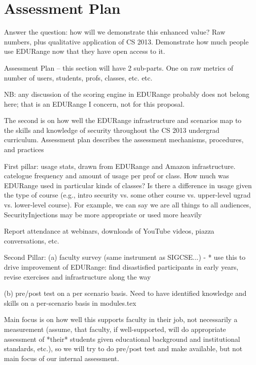 \section*{Assessment Plan}

Answer the question: how will we demonstrate this enhanced value? Raw numbers,
plus qualitative application of CS 2013. Demonstrate how much people use EDURange
now that they have open access to it.

Assessment Plan -- this section will have 2
   sub-parts. One on raw metrics of number of users, students, profs, classes, etc. etc. 

NB: any discussion of the scoring engine in EDURange probably does not belong here; that is
 an EDURange I concern, not for this proposal.

The second is on how well the EDURange infrastructure and scenarios
map to the skills and knowledge of security throughout the CS 2013
undergrad curriculum. Assessment plan describes the assessment
mechanisms, procedures, and practices


First pillar: usage stats, drawn from EDURange and Amazon infrastructure. catelogue
 frequency and amount of usage per prof or class. How much was EDURange used in particular
 kinds of classes? Is there a difference in usage given the type of course (e.g., intro
 security vs. some other course vs.  upper-level ugrad vs. lower-level course). For example,
 we can say we are all things to all audiences, SecurityInjections may be more appropriate
 or used more heavily

 Report attendance at webinars, downloads of YouTube videos, piazza conversations, etc.

Second Pillar:
 (a) faculty survey (same instrument as SIGCSE...)
    -   * use this to drive improvement of EDURange: find disastisfied participants in early
         years, revise exercises and infrastructure along the way
 
 (b) pre/post test on a per scenario basis. Need to have identified knowledge and skills on
     a per-scenario basis in modules.tex

 

Main focus is on how well this supports faculty in their job, not necessarily a measurement
(assume, that faculty, if well-supported, will do appropriate assessment of *their* students
given educational background and institutional standards, etc.), so we will try to do pre/post
test and make available, but not main focus of our internal assessment.

